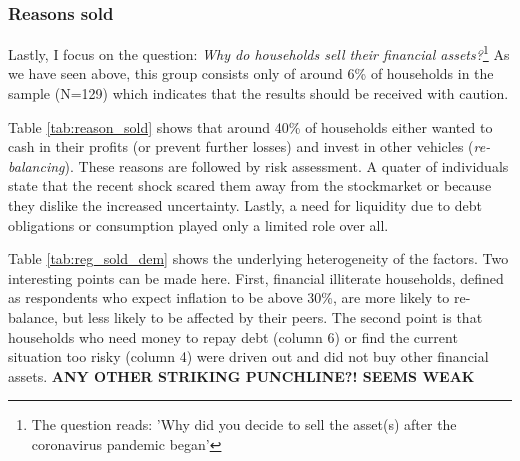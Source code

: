 \documentclass[ProjectABM]{subfiles}
\begin{document}
\subsubsection{Reasons sold}
Lastly, I focus on the question: \textit{Why do households sell their financial assets?}\footnote{The question reads: 'Why did you decide to sell the asset(s) after the coronavirus pandemic began'} As we have seen above, this group consists only of around 6\% of households in the sample (N=129) which indicates that the results should be received with caution.



Table \ref{tab:reason_sold} shows that around 40\% of households either wanted to cash in their profits (or prevent further losses) and invest in other vehicles (\textit{re-balancing}). These reasons are followed by risk assessment. A quater of individuals state that the recent shock scared them away from the stockmarket or because they dislike the increased uncertainty. Lastly, a need for liquidity due to debt obligations or consumption played only a limited role over all. %



Table \ref{tab:reg_sold_dem} shows the underlying heterogeneity of the factors. Two interesting points can be made here. First, financial illiterate households, defined as respondents who expect inflation to be above 30\%, are more likely to re-balance, but less likely to be affected by their peers. The second point is that households who need money to repay debt (column 6) or find the current situation too risky (column 4) were driven out and did not buy other financial assets. \textbf{ANY OTHER STRIKING PUNCHLINE?! SEEMS WEAK} 
\end{document}
